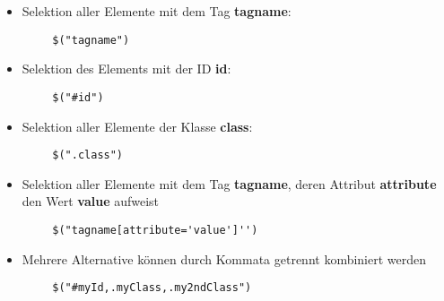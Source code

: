 \documentclass[10pt]{article}
\begin{document}
    \begin{tcolorbox}[
    colback=Red!5!white,
    colframe=Red!75!black,
    title={\centering Selektoren}]
    \begin{itemize}
        \item Selektion aller Elemente mit dem Tag \textbf{tagname}:
    \end{itemize}
    \begin{lstlisting}
        $("tagname")
    \end{lstlisting}
    \begin{itemize}
        \item Selektion des Elements mit der ID \textbf{id}:
    \end{itemize}
    \begin{lstlisting}
        $("#id")
    \end{lstlisting}
    \begin{itemize}
        \item Selektion aller Elemente der Klasse \textbf{class}:
    \end{itemize}
    \begin{lstlisting}
        $(".class")
    \end{lstlisting}
    \begin{itemize}
        \item Selektion aller Elemente mit dem Tag \textbf{tagname}, deren Attribut \textbf{attribute} den Wert \textbf{value} aufweist
    \end{itemize}
    \begin{lstlisting}
        $("tagname[attribute='value']'')
    \end{lstlisting}
    \begin{itemize}
        \item Mehrere Alternative können durch Kommata getrennt kombiniert werden
    \end{itemize}
    \begin{lstlisting}
        $("#myId,.myClass,.my2ndClass")
    \end{lstlisting}
    \end{tcolorbox}
\end{document}
